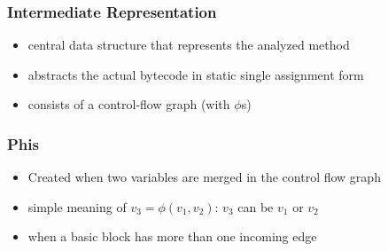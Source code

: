 \documentclass{beamer}
\begin{document}
\begin{frame}
  \frametitle{Intermediate Representation}
  
  \begin{itemize}
    \item central data structure that represents the analyzed method
    \item abstracts the actual bytecode in static single assignment form
    \item consists of a control-flow graph (with $\phi$s)
  \end{itemize}     
   
\end{frame}

\begin{frame}
   \frametitle{Phis}
   \begin{itemize}
      \item Created when two variables are merged in the control flow graph
      \item simple meaning of $v_3 = \phi(v_1, v_2)$: $v_3$ can be $v_1$ or $v_2$
      \item when a basic block has more than one incoming edge
   \end{itemize}

\end{frame}
\end{document}
